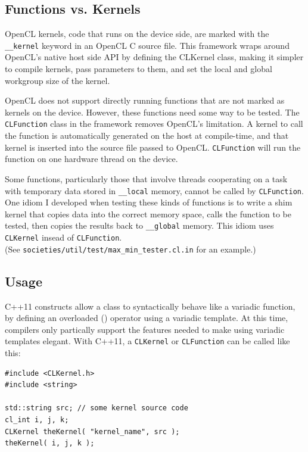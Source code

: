 \documentclass{article}
\begin{document}
\subsection{Functions vs. Kernels}
OpenCL kernels, code that runs on the device side, are marked with the \texttt{\_\_kernel} keyword in an OpenCL C source file. This framework wraps around OpenCL's native host side API by defining the CLKernel class, making it simpler to compile kernels, pass parameters to them, and set the local and global workgroup size of the kernel.

OpenCL does not support directly running functions that are not marked as kernels on the device. However, these functions need some way to be tested. The \texttt{CLFunction} class in the framework removes OpenCL's limitation. A kernel to call the function is automatically generated on the host at compile-time, and that kernel is inserted into the source file passed to OpenCL. \texttt{CLFunction} will run the function on one hardware thread on the device.

Some functions, particularly those that involve threads cooperating on a task with temporary data stored in \texttt{\_\_local} memory, cannot be called by \texttt{CLFunction}. One idiom I developed when testing these kinds of functions is to write a shim kernel that copies data into the correct memory space, calls the function to be tested, then copies the results back to \texttt{\_\_global} memory. This idiom uses \texttt{CLKernel} insead of \texttt{CLFunction}. \\ (See \texttt{societies/util/test/max\_min\_tester.cl.in} for an example.)

\subsection{Usage}
C++11 constructs allow a class to syntactically behave like a variadic function, by defining an overloaded () operator using a variadic template. At this time, compilers only partically support the features needed to make using variadic templates elegant. With C++11, a \texttt{CLKernel} or \texttt{CLFunction} can be called like this:

\begin{lstlisting}
#include <CLKernel.h>
#include <string>

std::string src; // some kernel source code
cl_int i, j, k;
CLKernel theKernel( "kernel_name", src );
theKernel( i, j, k );
\end{lstlisting}
\end{document}
